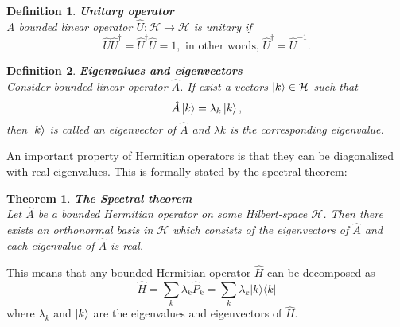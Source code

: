 \documentclass[12pt, a4paper]{article}
\newcommand{\ketbra}[2]{|#1\rangle\langle#2|}
\newtheorem{theorem}{Theorem}
\newtheorem{definition}{Definition}
\begin{document}
\begin{definition}
    \textbf{Unitary operator}
    \\A bounded linear operator $\hat U : \mathcal H\rightarrow \mathcal H$ is unitary if 
    \begin{equation}
        \hat U\hat U^\dagger = \hat U^\dagger \hat U = 1, \textrm{ in other words, } \hat U^{\dagger} = \hat U^{-1}. 
    \end{equation}
\end{definition}

\begin{definition}
    \textbf{Eigenvalues and eigenvectors}
    \\Consider bounded linear operator $\hat A$. If exist a vectors $\ket k \in \mathcal H$ such that
    \begin{equation}
        \hat A \ket k = \lambda_k\ket k,
    \end{equation}
    then $\ket k$ is called an eigenvector of $\hat A$ and $\lambda k$ is the corresponding eigenvalue.
\end{definition}

An important property of Hermitian operators is that they can be diagonalized with real eigenvalues. 
This is formally stated by the spectral theorem:
\begin{theorem}
    \textbf{The Spectral theorem}
    \\Let $\hat A$ be a bounded Hermitian operator on some Hilbert-space $\mathcal H$. Then there exists an orthonormal
    basis in $\mathcal H$ which consists of the eigenvectors of $\hat A$ and each eigenvalue of $\hat A$ is real.
\end{theorem}
This means that any bounded Hermitian operator $\hat H$ can be decomposed as 
\begin{equation}
    \hat H = \sum\limits_{k}\lambda_k \hat P_k = \sum\limits_{k}\lambda_k \ketbra{k}{k}
\end{equation}
where $\lambda_k$ and $\ket k$ are the eigenvalues and eigenvectors of $\hat H$.
\end{document}
